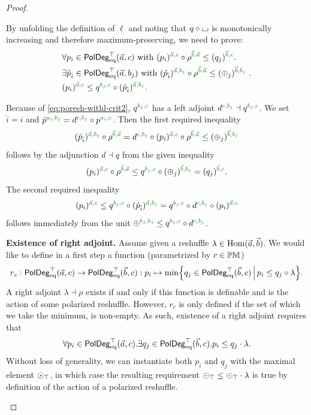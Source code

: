 \documentclass[a4paper]{memoir}
\begin{document}
\begin{proof}
\begin{enumerate}
\begin{itemize}
\begin{itemize}
				By unfolding the definition of $\ell$ and noting that $q \circ {\llcorner\hspace{-.4ex}\lrcorner}$ is monotonically increasing and therefore maximum-preserving, we need to prove:
				\begin{align*}
					&\forall p_i \in \poldegeqtop(\vec a, c) \text{ with $(p_i)\pmrhom{\vec a}{c} \circ \rho\pmrhom{\vec b}{\vec a} \leq (q_j)\pmrhom{\vec b}{c}$} .\\
					&\exists \hat p_{\hat i} \in \poldegeqtop(\vec a, b_j) \text{ with $(\hat p_{\hat i})\pmrhom{\vec a}{b_j} \circ \rho\pmrhom{\vec b}{\vec a} \leq (\pospol_j)\pmrhom{\vec b}{b_j}$ } .\\
					&(p_i)\pmrhom{\vec a}{c} \leq q\pmrhom{b_j}{c} \circ (\hat p_{\hat i})\pmrhom{\vec a}{b_j}.
				\end{align*}
				
				Because of \cref{eq:poresh-withl-crit2}, $q\pmrhom{b_j}{c}$ has a left adjoint $d\pmrhom{c}{b_j} \dashv q\pmrhom{b_j}{c}$.
				We set $\hat i = i$ and $\hat p \pmrhom{a_i}{b_j} = d\pmrhom{c}{b_j} \circ p\pmrhom{a_i}{c}$.
				Then the first required inequality
				\[
					(\hat p_{\hat i})\pmrhom{\vec a}{b_j} \circ \rho\pmrhom{\vec b}{\vec a} = d\pmrhom{c}{b_j} \circ (p_i)\pmrhom{\vec a}{c} \circ \rho\pmrhom{\vec b}{\vec a} \leq (\pospol_j)\pmrhom{\vec b}{b_j}
				\]
				follows by the adjunction $d \dashv q$ from the given inequality
				\[
					(p_i)\pmrhom{\vec a}{c} \circ \rho\pmrhom{\vec b}{\vec a} \leq q\pmrhom{b_j}{c} \circ (\pospol_j)\pmrhom{\vec b}{b_j} = (q_j)\pmrhom{\vec b}{c}.
				\]
				The second required inequality
				\[
					(p_i)\pmrhom{\vec a}{c} \leq q\pmrhom{b_j}{c} \circ (\hat p_{\hat i})\pmrhom{\vec a}{b_j} = q\pmrhom{b_j}{c} \circ d\pmrhom{c}{b_j} \circ (p_i)\pmrhom{\vec a}{c}
				\]
				follows immediately from the unit $\pospol\pmrhom{b_j}{b_j} \leq q\pmrhom{b_j}{c} \circ d\pmrhom{c}{b_j}$.
			\end{itemize}
		\end{itemize}
		
		\textbf{Existence of right adjoint.}
		Assume given a reshuffle $\lambda \in {\mathrm{Hom}}(\vec a, \vec b)$.
		We would like to define in a first step a function (parametrized by $c \in {\mathbb{PM}}$)
		\[
			r_c : \mathsf{PolDeg}_{\mathrm{eq}}^\top(\vec a, c) \to \mathsf{PolDeg}_{\mathrm{eq}}^\top(\vec b, c) : p_i \mapsto \min \mathopen{}\left\{ q_j \in \mathsf{PolDeg}_{\mathrm{eq}}^\top(\vec b, c) \,\middle|\, p_i \leq q_j \circ \lambda \right\}\mathclose{}.
		\]
		A right adjoint $\lambda \dashv \rho$ exists if and only if this function is definable and is the action of some polarized reshuffle.
		However, $r_c$ is only defined if the set of which we take the minimum, is non-empty.
		As such, existence of a right adjoint requires that
		\[
			\forall p_i \in \mathsf{PolDeg}_{\mathrm{eq}}^\top(\vec a, c) . \exists q_j \in \mathsf{PolDeg}_{\mathrm{eq}}^\top(\vec b, c). p_i \leq q_j \cdot \lambda.
		\]
		Without loss of generality, we can instantiate both $p_i$ and $q_j$ with the maximal element ${\odot}_\top$, in which case the resulting requirement ${\odot}_\top \leq {\odot}_\top \cdot \lambda$ is true by definition of the action of a polarized reshuffle.
		

\end{enumerate}
\end{proof}
\end{document}
